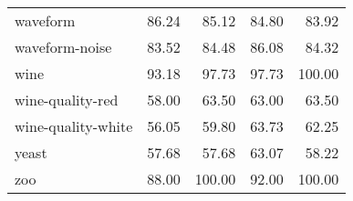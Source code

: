 \begin{longtable}{lrrrr}
                      waveform &   86.24 &    85.12 &  84.80 &  83.92 \\
                waveform-noise &   83.52 &    84.48 &  86.08 &  84.32 \\
                          wine &   93.18 &    97.73 &  97.73 & 100.00 \\
              wine-quality-red &   58.00 &    63.50 &  63.00 &  63.50 \\
            wine-quality-white &   56.05 &    59.80 &  63.73 &  62.25 \\
                         yeast &   57.68 &    57.68 &  63.07 &  58.22 \\
                           zoo &   88.00 &   100.00 &  92.00 & 100.00 \\
\end{longtable}
